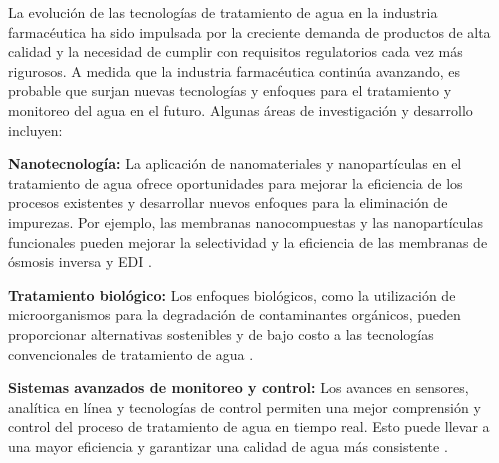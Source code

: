 La evolución de las tecnologías de tratamiento de agua en la industria farmacéutica ha sido impulsada por la creciente
demanda de productos de alta calidad y la necesidad de cumplir con requisitos regulatorios cada vez más rigurosos. A
medida que la industria farmacéutica continúa avanzando, es probable que surjan nuevas tecnologías y enfoques para el
tratamiento y monitoreo del agua en el futuro. Algunas áreas de investigación y desarrollo incluyen:

\textbf{Nanotecnología:} La aplicación de nanomateriales y nanopartículas en el tratamiento de agua ofrece oportunidades para
mejorar la eficiencia de los procesos existentes y desarrollar nuevos enfoques para la eliminación de impurezas. Por ejemplo,
las membranas nanocompuestas y las nanopartículas funcionales pueden mejorar la selectividad y la eficiencia de las membranas de ósmosis
inversa y EDI \cite{quxApplicationsNanotechnologyWater2013}.

\textbf{Tratamiento biológico:} Los enfoques biológicos, como la utilización de microorganismos para la degradación de contaminantes
orgánicos, pueden proporcionar alternativas sostenibles y de bajo costo a las tecnologías convencionales de tratamiento de agua \cite{b.siziriciyildizWaterWastewaterTreatment2012}.

\textbf{Sistemas avanzados de monitoreo y control:} Los avances en sensores, analítica en línea y tecnologías de control permiten
una mejor comprensión y control del proceso de tratamiento de agua en tiempo real. Esto puede llevar a una mayor eficiencia y
garantizar una calidad de agua más consistente \cite{kayayAdvancesRealtimeMonitoring2020}.


